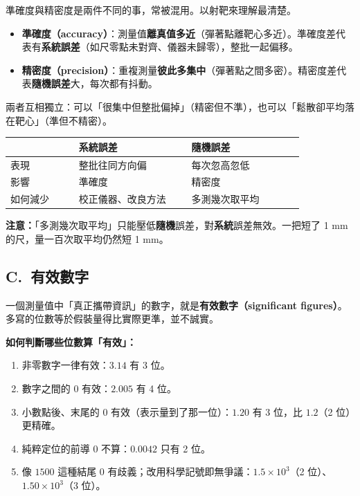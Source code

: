 \documentclass[11pt]{article}
\begin{document}
準確度與精密度是兩件不同的事，常被混用。以射靶來理解最清楚。


\begin{itemize}\setlength{\itemsep}{1pt}
\item \textbf{準確度（accuracy）}：測量值\textbf{離真值多近}（彈著點離靶心多近）。準確度差代表有\textbf{系統誤差}（如尺零點未對齊、儀器未歸零），整批一起偏移。
\item \textbf{精密度（precision）}：重複測量\textbf{彼此多集中}（彈著點之間多密）。精密度差代表\textbf{隨機誤差}大，每次都有抖動。
\end{itemize}

兩者互相獨立：可以「很集中但整批偏掉」（精密但不準），也可以「鬆散卻平均落在靶心」（準但不精密）。

\begin{center}
\renewcommand{\arraystretch}{1.3}
\begin{tabular}{p{0.20\linewidth} p{0.33\linewidth} p{0.33\linewidth}}
\hline
 & \textbf{系統誤差} & \textbf{隨機誤差} \\
\hline
表現 & 整批往同方向偏 & 每次忽高忽低 \\
影響 & 準確度 & 精密度 \\
如何減少 & 校正儀器、改良方法 & 多測幾次取平均 \\
\hline
\end{tabular}
\end{center}

\textbf{注意：}「多測幾次取平均」只能壓低\textbf{隨機}誤差，對\textbf{系統}誤差無效。一把短了 1 mm 的尺，量一百次取平均仍然短 1 mm。

\subsection*{\sffamily C.\ 有效數字}

一個測量值中「真正攜帶資訊」的數字，就是\textbf{有效數字（significant figures）}。多寫的位數等於假裝量得比實際更準，並不誠實。

\textbf{如何判斷哪些位數算「有效」：}
\begin{enumerate}\setlength{\itemsep}{1pt}
\item 非零數字一律有效：$3.14$ 有 3 位。
\item 數字之間的 0 有效：$2.005$ 有 4 位。
\item 小數點後、末尾的 0 有效（表示量到了那一位）：$1.20$ 有 3 位，比 $1.2$（2 位）更精確。
\item 純粹定位的前導 0 不算：$0.0042$ 只有 2 位。
\item 像 $1500$ 這種結尾 0 有歧義；改用科學記號即無爭議：$1.5\times10^3$（2 位）、$1.50\times10^3$（3 位）。
\end{enumerate}
\end{document}
